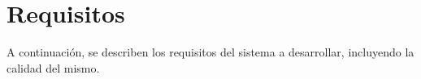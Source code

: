 \section{Requisitos}

A continuación, se describen los requisitos del sistema a desarrollar, incluyendo la calidad del mismo.

